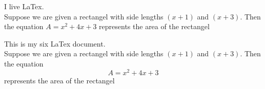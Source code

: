 \documentclass[11]{article}
\begin{document}
I live LaTex. \\
Suppose we are given a rectangel with side lengths $(x+1)$ and $(x+3)$. Then the equation $A=x^2+4x+3$ represents the area of the rectangel

This is my six LaTex document. \\
Suppose we are given a rectangel with side lengths $(x+1)$ and $(x+3)$. Then the equation $$A=x^2+4x+3$$ represents the area of the rectangel
\end{document}
